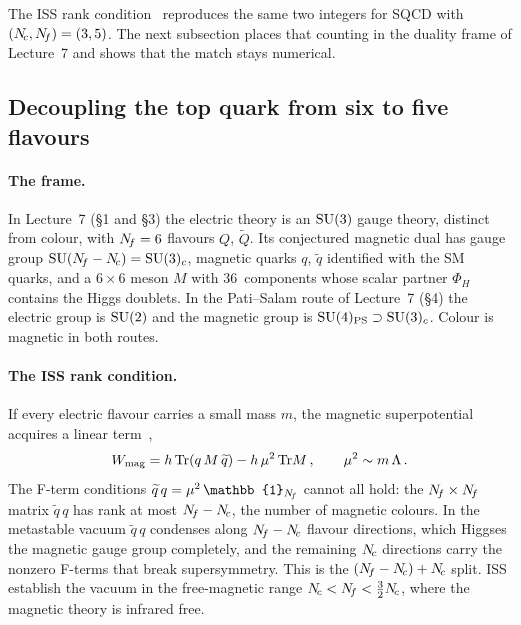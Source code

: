 \documentclass[11pt,a4paper]{article}
\begin{document}
The ISS rank condition~\cite{ISS2006} reproduces the same two
integers for SQCD with $(N_{\!c},N_{\!f}) = (3,5)$.  The next subsection
places that counting in the duality frame of Lecture~7 and shows
that the match stays numerical.

\subsection{Decoupling the top quark from six to five flavours}
\label{sec:top-decoupling}

\paragraph{The frame.}  In Lecture~7 (\S1 and \S3) the electric
theory is an $\mathrm{SU}(3)$ gauge theory, distinct from colour, with
$N_{\!f} = 6$ flavours $Q$, $\widetilde Q$.  Its conjectured magnetic dual
has gauge group $\mathrm{SU}(N_{\!f}-N_{\!c}) = \mathrm{SU}(3)_c$, magnetic quarks $q$,
$\widetilde q$ identified with the SM quarks, and a $6\times 6$ meson
$M$ with 36~components whose scalar partner $\Phi_H$ contains the
Higgs doublets.  In the Pati--Salam route of Lecture~7 (\S4) the
electric group is $\mathrm{SU}(2)$ and the magnetic group is
$\mathrm{SU}(4)_{\text{PS}} \supset \mathrm{SU}(3)_c$.  Colour is magnetic in both
routes.

\paragraph{The ISS rank condition.}  If every electric flavour
carries a small mass $m$, the magnetic superpotential acquires a
linear term~\cite{ISS2006},
\begin{equation}
  W_{\text{mag}} = h\,\mathrm{Tr}(q\,M\,\widetilde q) - h\,\mu^2\,\mathrm{Tr} M\,,
  \qquad \mu^2 \sim m\,\Lambda\,.
  \label{eq:iss-w}
\end{equation}
The F-term conditions $\widetilde q\,q = \mu^2\,\mathbb{1}_{\Nf}$
cannot all hold: the $N_{\!f}\times N_{\!f}$ matrix $\widetilde q\,q$ has rank
at most $N_{\!f}-N_{\!c}$, the number of magnetic colours.  In the
metastable vacuum $\widetilde q\,q$ condenses along $N_{\!f}-N_{\!c}$ flavour
directions, which Higgses the magnetic gauge group completely, and
the remaining $N_{\!c}$ directions carry the nonzero F-terms that break
supersymmetry.  This is the $(N_{\!f}-N_{\!c})+N_{\!c}$ split.  ISS establish the
vacuum in the free-magnetic range $N_{\!c} < N_{\!f} < \tfrac{3}{2}N_{\!c}$,
where the magnetic theory is infrared free.
\end{document}
